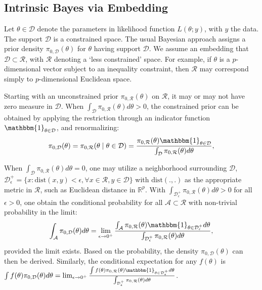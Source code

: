 \documentclass[10pt]{article}
\newcommand{\mc}[1]{\mathcal{#1}}
\DeclareMathOperator{\1}{\mathbbm{1}}
\begin{document}
\subsection{Intrinsic Bayes via Embedding}
Let $\theta \in \mc D$ denote the parameters in likelihood function $L(\theta;y)$, with $y$ the data. The support $\mc D$ is a constrained space. The usual Bayesian approach assigns a prior density $\pi_{0,\mc D}(\theta)$ for $\theta$ having support $\mc D$. We assume an embedding that $\mc D \subset \mc R$, with $\mc R$ denoting a `less constrained' space. For example, if $\theta$ is a $p$-dimensional vector subject to an inequality constraint, then $\mc R$ may correspond simply to $p$-dimensional Euclidean space.

Starting with an unconstrained prior $\pi_{0,\mc R}(\theta)$ on $\mc R$, it may or may not have zero measure in $\mc D$. When $ \int_{\mc D} \pi_{0,\mc R}(\theta)d\theta >0$, the constrained prior can be obtained by applying the restriction through an indicator function $\mathbbm{1}_{\theta\in \mc D}$, and renormalizing:
\begin{equation}
\begin{aligned}
\label{exact_prior1}
\pi_{0,\mc D}(\theta)= \pi_{0,\mc R}(\theta \mid \theta \in \mc D) = \frac{ \pi_{0,\mc R}(\theta) \mathbbm{1}_{\theta\in \mc D} }{ \int_{\mc D} \pi_{0,\mc R}(\theta)d\theta },
\end{aligned}
\end{equation}

When $ \int_{\mc D} \pi_{0,\mc R}(\theta)d\theta =0$, one may utilize a neighborhood surrounding $\mc D$, $\mc D_\epsilon^+ = \{x: \text{dist}(x,y)<\epsilon, \forall x\in \mc R,y\in \mc D\}$ with $\text{dist}(.,.)$ as the appropriate metric in $\mc R$, such as Euclidean distance in $\mathbb R^p$. With $\int_{\mc D^+_\epsilon} \pi_{0,\mc R}(\theta)d\theta>0$ for all $\epsilon>0$, one obtain the conditional probability for all $\mc A \subset \mc R$ with non-trivial probability in the limit: 
\begin{equation}
\begin{aligned}
\label{exact_prior2}
\int_{\mc A} \pi_{0,\mc D}(\theta) d\theta=\lim_{\epsilon\rightarrow 0^+} \frac{\int_{\mc A} \pi_{0,\mc R}(\theta) \mathbbm{1}_{\theta\in \mc D_\epsilon^+} d\theta}{ \int_{\mc D_\epsilon^+} \pi_{0,\mc R}(\theta)d\theta },
\end{aligned}
\end{equation}
provided the limit exists. Based on the probability, the density $\pi_{0,\mc D}(\theta)$ can then be derived. Similarly, the conditional expectation for any $f(\theta)$ is $\int f(\theta)\pi_{0,\mc D}(\theta) d\theta=\lim_{\epsilon\rightarrow 0^+} \frac{\int f(\theta) \pi_{0,\mc R}(\theta) \mathbbm{1}_{\theta\in \mc D_\epsilon^+} d\theta}{ \int_{\mc D_\epsilon^+} \pi_{0,\mc R}(\theta)d\theta }$.
\end{document}

